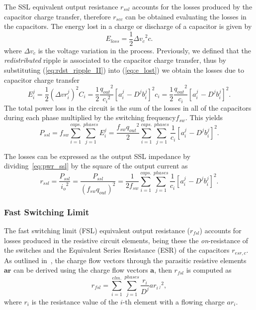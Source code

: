 The SSL equivalent output resistance $r_{ssl}$ accounts for the losses produced by the capacitor charge transfer, therefore $r_{scc}$ can be obtained evaluating the losses in the capacitors.  The energy lost in a charge or discharge of a capacitor is given by
\begin{equation}
E_{loss}=\frac{1}{2}{{\Delta{v}}_c}^2 c.
\label{eq:e_lost}
\end{equation}
where $\Delta v_c$ is the voltage variation in the process. Previously, we defined that the \emph{redistributed} ripple is associated to the capacitor charge transfer, thus by substituting (\ref{eq:rdst_ripple_II}) into (\ref{eq:e_lost}) we obtain the losses due to capacitor charge transfer 
\begin{equation}
E_i^j=\frac{1}{2}{({\Delta{vr}}_i^j)}^2C_i=\frac{1}{2}\frac{{q_{out}}^2}{{c_i}^2}{\left[a_{i\
}^j-{D^j} {b_i^j}\right]}^2c_i=\frac{1}{2}\frac{{q_{out}}^2}{c_i}{\left[a_{i\
}^j-{D^j} {b_i^j}\right]}^2 .
\label{eq:e_lost_ssl}
\end{equation}
The total power loss in the circuit is the sum of the losses in all of the
capacitors during each phase multiplied by the switching frequency$f_{sw}$.
This yield{\small s}
\begin{equation}
P_{ssl}= f_{sw} \sum_{i=1}^{caps.}\sum_{j=1}^{phases} E_i^j =\frac{f_{sw}{q_{out}}^2}{2}\sum_{i=1}^{caps.}\sum_{j=1}^{phases}\frac{1}{c_i}{\left[a_{i\
}^j-{D^j}{b_i^j}\right]}^2.
\label{eq:pwr_ssl}
\end{equation}

The losses can be expressed as the output SSL impedance by dividing~\ref{eq:pwr_ssl} by the
square of the output current as
\begin{equation}
r_{ssl}=\frac{P_{ssl}}{{i_o}^2}=\frac{P_{ssl}}{{(f_{sw} {q_{out}})}^2}=\frac{1}{2 f_{sw}}\sum_{i=1}^{caps.}\sum_{j=1}^{phases}\frac{1}{c_i}{\left[a_{i\
}^j-{D^j} {b_i^j}\right]}^2.
\label{eq:r_ssl}
\end{equation}


\subsubsection[FSL]{Fast Switching Limit}
The fast switching limit (FSL) equivalent output resistance ($r_{fsl}$) accounts for losses produced in the resistive circuit elements, being these the \emph{on}-resistance of the switches and the Equivalent Series Resistance (ESR) of the capacitors $r_{esr,c}$. As outlined in~\cite{Seeman:EECS-2009-78}, the charge flow vectors through the parasitic resistive elements $\mathbf{ar}$ can be derived using the charge flow vectors $\mathbf{a}$, then $r_{fsl}$ is computed as 
\begin{equation}
r_{fsl}=\sum_{i=1}^{elm.}\sum_{j=1}^{phases}\frac{r_i}{D^j}{{ar}_{i\ ^j}}^2,
\label{eq:r_ssl}
\end{equation}
where $r_i$ is the resistance value of the $i$-th element with a flowing charge $ar_i$.  



